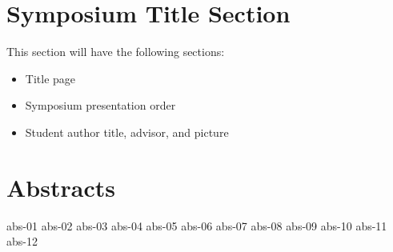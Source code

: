 \documentclass[12pt]{article}
\begin{document}
\section{Symposium Title Section}
This section will have the following sections:
\begin{itemize}
    \item Title page
    \item Symposium presentation order
    \item Student author title, advisor, and picture
\end{itemize}

\section{Abstracts}
    {abs-01}
    {abs-02}
    {abs-03}
    {abs-04}
    {abs-05}
    {abs-06}
    {abs-07}
    {abs-08}
    {abs-09}
    {abs-10}
    {abs-11}
    {abs-12}
\end{document}
